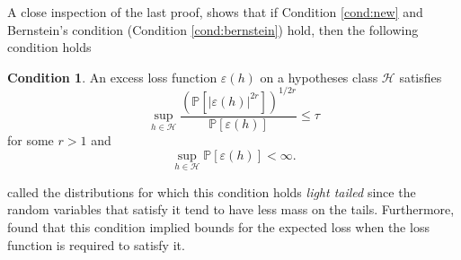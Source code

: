 \documentclass{uvamath}
\newcommand*{\calH}{\mathcal{H}}
\newcommand*{\bbP}{\mathbb{P}}
\newcommand*{\expv}[1]{\mathbb{P}\left[#1\right]}
\theoremstyle{remark}
\theoremstyle{definition}
\theoremstyle{definition}
\theoremstyle{definition}
\theoremstyle{definition}
\theoremstyle{definition}
\newtheorem{condition}{Condition}
\begin{document}
A close inspection of the last proof, shows that if Condition
\ref{cond:new} and Bernstein's condition (Condition
\ref{cond:bernstein}) hold, then the following condition holds
\begin{condition}\label{cond:vapnik}
  An excess loss function $\varepsilon(h)$ on a hypotheses class
  $\calH$ satisfies
  \begin{equation*}
    \sup_{h\in\calH}\frac{(\bbP[|\varepsilon(h)|^{2r}])^{1/2r}}{\bbP[\varepsilon(h)]}\leq
    \tau
  \end{equation*}
  for some $r>1$ and
  \begin{equation*}
    \sup_{h\in\calH}\expv{\varepsilon(h)}<\infty.
  \end{equation*}
\end{condition}

\citet[Section 5.7]{vapnik_statistical_1998} called the distributions
for which this condition holds \textit{light tailed} since the random
variables that satisfy it tend to have less mass on the
tails. Furthermore, \citet{vapnik_statistical_1998} found that this
condition implied bounds for the expected loss when the loss function
is required to satisfy it.
\end{document}
